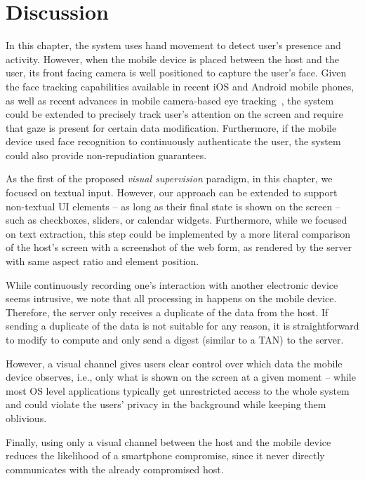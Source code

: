 
\section{Discussion} 
\label{integriscreen:sec:discussion}


In this chapter, the system uses hand movement to detect user's presence and activity.
However, when the mobile device is placed between the host and the user, its front facing camera is well positioned to capture the user's face.
Given the face tracking capabilities available in recent iOS and Android mobile phones, as well as recent advances in mobile camera-based eye tracking~\cite{krafka2016eye}, the system could be extended to precisely track user's attention on the screen and require that gaze is present for certain data modification.
Furthermore, if the mobile device used face recognition to continuously authenticate the user, the system could also provide non-repudiation guarantees.


As the first of the proposed \textit{visual supervision} paradigm, in this chapter, we focused on textual input.
However, our approach can be extended to support non-textual UI elements -- as long as their final state is shown on the screen -- such as checkboxes, sliders, or calendar widgets.
Furthermore, while we focused on text extraction, this step could be implemented by a more literal comparison of the host's screen with a screenshot of the web form, as rendered by the server with same aspect ratio and element position.

While continuously recording one's interaction with another electronic device seems intrusive, we note that all processing in \sysname happens on the mobile device.
Therefore, the server only receives a duplicate of the data from the host.
If sending a duplicate of the data is not suitable for any reason, it is straightforward to modify \name to compute and only send a digest (similar to a TAN) to the server.

However, a visual channel gives users clear control over which data the mobile device observes, i.e., only what is shown on the screen at a given moment -- while most OS level applications typically get unrestricted access to the whole system and could violate the users' privacy in the background while keeping them oblivious.

Finally, using only a visual channel between the host and the mobile device reduces the likelihood of a smartphone compromise, since it never directly communicates with the already compromised host.